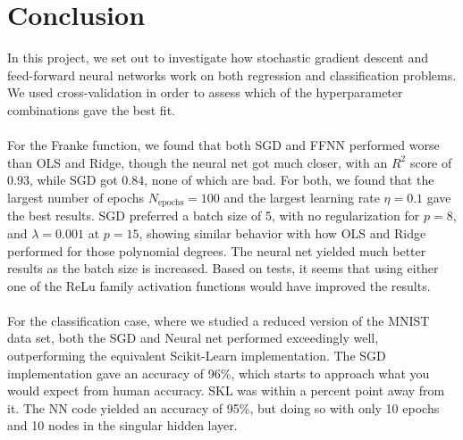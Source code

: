 \documentclass[a4paper]{article}
\newcommand{\Nepochs}{N_{\text{epochs}}}
\begin{document}
\section{Conclusion} \label{chap:conclusion}
In this project, we set out to investigate how stochastic gradient descent and feed-forward neural networks work on both regression and classification problems. We used cross-validation in order to assess which of the hyperparameter combinations gave the best fit.
\\\\
For the Franke function, we found that both SGD and FFNN performed worse than OLS and Ridge, though the neural net got much closer, with an $R^2$ score of $0.93$, while SGD got $0.84$, none of which are bad. For both, we found that the largest number of epochs $\Nepochs = 100$ and the largest learning rate $\eta=0.1$ gave the best results. SGD preferred a batch size of 5, with no regularization for $p=8$, and $\lambda=0.001$ at $p=15$, showing similar behavior with how OLS and Ridge performed for those polynomial degrees. The neural net yielded much better results as the batch size is increased. Based on tests, it seems that using either one of the ReLu family activation functions would have improved the results.
\\\\
For the classification case, where we studied a reduced version of the MNIST data set, both the SGD and Neural net performed exceedingly well, outperforming the equivalent Scikit-Learn implementation. The SGD implementation gave an accuracy of 96\%, which starts to approach what you would expect from human accuracy. SKL was within a percent point away from it. The NN code yielded an accuracy of 95\%, but doing so with only 10 epochs and 10 nodes in the singular hidden layer. 

\end{document}
